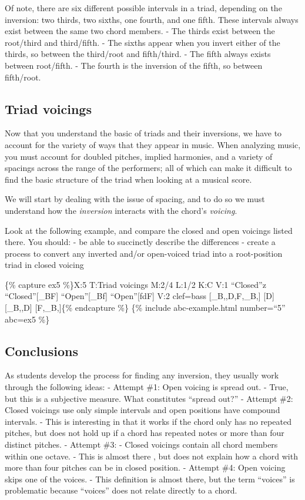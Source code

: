 \documentclass{book}
\begin{document}
Of note, there are six different possible intervals in a triad, depending on
the inversion: two thirds, two sixths, one fourth, and one fifth. These
intervals always exist between the same two chord members. - The thirds exist
between the root/third and third/fifth. - The sixths appear when you invert
either of the thirds, so between the third/root and fifth/third. - The fifth
always exists between root/fifth. - The fourth is the inversion of the fifth,
so between fifth/root.

\hypertarget{triad-voicings}{%
\subsection{Triad voicings}\label{triad-voicings}}

Now that you understand the basic of triads and their inversions, we have to
account for the variety of ways that they appear in music. When analyzing
music, you must account for doubled pitches, implied harmonies, and a variety
of spacings across the range of the performers; all of which can make it
difficult to find the basic structure of the triad when looking at a musical
score.

We will start by dealing with the issue of spacing, and to do so we must
understand how the \emph{inversion} interacts with the chord's \emph{voicing}.

Look at the following example, and compare the closed and open voicings listed
there. You should: - be able to succinctly describe the differences - create a
process to convert any inverted and/or open-voiced triad into a root-position
triad in closed voicing

\{\% capture ex5 \%\}X:5 T:Triad voicings M:2/4 L:1/2 K:C V:1
``Closed''z\textbar{} ``Closed''{[}\_BF{]}\textbar{}
``Open''{[}\_Bf{]}\textbar{} ``Open''{[}fdF{]}\textbar{} V:2 clef=bass
{[}\_B,,D,F,\_B,{]}\textbar{} {[}D{]}\textbar{} {[}\_B,,D{]}\textbar{}
{[}F,\_B,{]}\textbar\{\% endcapture \%\} \{\% include abc-example.html
number=``5'' abc=ex5 \%\}

\hypertarget{conclusions-24}{%
\subsection{Conclusions}\label{conclusions-24}}

As students develop the process for finding any inversion, they usually work
through the following ideas: - Attempt \#1: Open voicing is spread out. -
True, but this is a subjective measure. What constitutes ``spread out?'' -
Attempt \#2: Closed voicings use only simple intervals and open positions have
compound intervals. - This is interesting in that it works if the chord only
has no repeated pitches, but does not hold up if a chord has repeated notes or
more than four distinct pitches. - Attempt \#3: - Closed voicings contain all
chord members within one octave. - This is almost there , but does not explain
how a chord with more than four pitches can be in closed position. - Attempt
\#4: Open voicing skips one of the voices. - This definition is almost there,
but the term ``voices'' is problematic because ``voices'' does not relate
directly to a chord.
\end{document}
